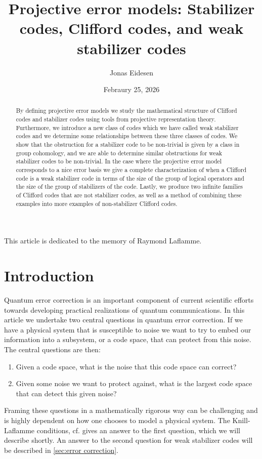 \documentclass[11pt, oneside, reqno]{amsart}
\title[]{Projective error models: Stabilizer codes, Clifford codes, and weak stabilizer codes}
\date{Febraury 25, 2026}
\author[1]{Jonas Eidesen}
\theoremstyle{definition}
\theoremstyle{plain}
\theoremstyle{remark}
\begin{document}
\begin{abstract}
    By defining projective error models we study the mathematical structure of Clifford codes and stabilizer codes using tools from projective representation theory. Furthermore, we introduce a new class of codes which we have called weak stabilizer codes and we determine some relationships between these three classes of codes. We show that the obstruction for a stabilizer code to be non-trivial is given by a class in group cohomology, and we are able to determine similar obstructions for weak stabilizer codes to be non-trivial. In the case where the projective error model corresponds to a nice error basis we give a complete characterization of when a Clifford code is a weak stabilizer code in terms of the size of the group of logical operators and the size of the group of stabilizers of the code. Lastly, we produce two infinite families of Clifford codes that are not stabilizer codes, as well as a method of combining these examples into more examples of non-stabilizer Clifford codes.
\end{abstract}

\maketitle

\begin{center}
    This article is dedicated to the memory of Raymond Laflamme.
\end{center}

\section{Introduction}\label{sec:Introduction}

Quantum error correction is an important component of current scientific efforts towards developing practical realizations of quantum communications. In this article we undertake two central questions in quantum error correction. If we have a physical system that is susceptible to noise we want to try to embed our information into a subsystem, or a code space, that can protect from this noise. The central questions are then:
\begin{enumerate}
    \item Given a code space, what is the noise that this code space can correct?
    \item Given some noise we want to protect against, what is the largest code space that can detect this given noise?
\end{enumerate}
Framing these questions in a mathematically rigorous way can be challenging and is highly dependent on how one chooses to model a physical system. The Knill-Laflamme conditions, cf. \cite{KnillLaflamme97} gives an answer to the first question, which we will describe shortly. An answer to the second question for weak stabilizer codes will be described in \cref{sec:error correction}.
\end{document}
